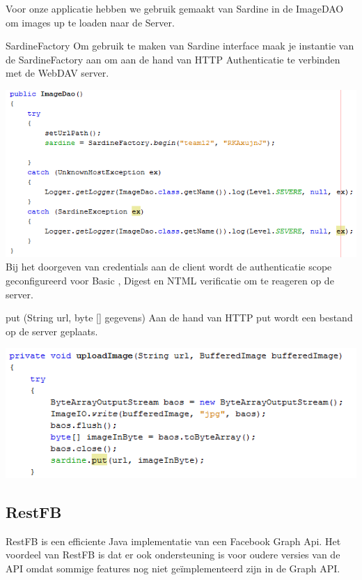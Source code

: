 \documentclass[pdftex,a4paper,12pt,twoside]{report}
\begin{document}
Voor onze applicatie hebben we gebruik gemaakt van Sardine in de ImageDAO om images up te loaden naar de Server.


SardineFactory
Om gebruik te maken van Sardine interface maak je instantie van de SardineFactory aan om aan de hand van HTTP Authenticatie te verbinden met de WebDAV server.

\includegraphics{images/sardine.png}\\

Bij het doorgeven van credentials aan de client wordt de authenticatie scope geconfigureerd voor Basic , Digest en NTML verificatie om te reageren op de server.

put (String url, byte [] gegevens)
Aan de hand van HTTP put wordt een bestand op de server geplaats.

\includegraphics{images/sardineupload.png}\\



\subsection{RestFB}

RestFB is een efficiente Java implementatie van een Facebook Graph Api.
Het voordeel van RestFB is dat er ook ondersteuning is voor oudere versies van de API omdat sommige features nog niet geïmplementeerd zijn in de Graph API.
\end{document}
